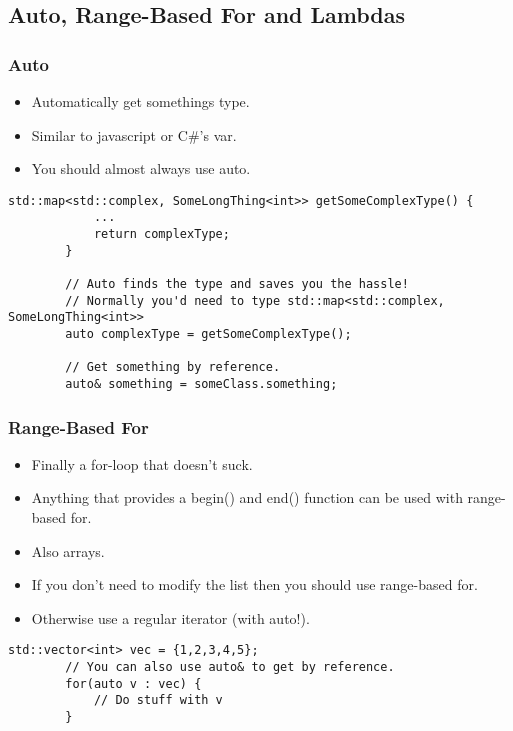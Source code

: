 \documentclass{beamer}
\begin{document}
\subsection{Auto, Range-Based For and Lambdas}
\begin{frame}[fragile]
	\frametitle{Auto}
	\begin{itemize}
		\item Automatically get somethings type.
		\item Similar to javascript or C\#'s var.
		\item You should almost always use auto.
	\end{itemize}

	\begin{lstlisting}[language=nuclear]
		std::map<std::complex, SomeLongThing<int>> getSomeComplexType() {
		    ...
		    return complexType;
		}

		// Auto finds the type and saves you the hassle!
		// Normally you'd need to type std::map<std::complex, SomeLongThing<int>>
		auto complexType = getSomeComplexType();

		// Get something by reference.
		auto& something = someClass.something;
	\end{lstlisting}
\end{frame}

\begin{frame}[fragile]
	\frametitle{Range-Based For}
	\begin{itemize}
		\item Finally a for-loop that doesn't suck.
		\item Anything that provides a begin() and end() function can be used with range-based for.
		\item Also arrays.
		\item If you don't need to modify the list then you should use range-based for.
		\item Otherwise use a regular iterator (with auto!).
	\end{itemize}

	\begin{lstlisting}[language=nuclear]
		std::vector<int> vec = {1,2,3,4,5};
		// You can also use auto& to get by reference.
		for(auto v : vec) {
		    // Do stuff with v
		}
	\end{lstlisting}
\end{frame}
\end{document}
